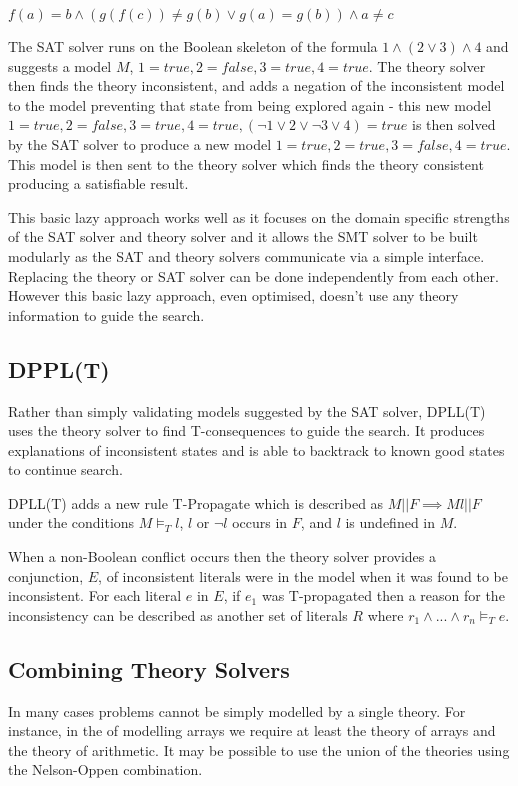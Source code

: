 \documentclass[]{final_report}
\begin{document}
$ f(a) = b \land  (g(f(c)) \neq g(b) \lor g(a) = g(b)) \land a \neq c $

The SAT solver runs on the Boolean skeleton of the formula $1 \land (2 \lor 3) \land 4$ and suggests a model $M$, $1 = \mathit{true}, 2 = \mathit{false}, 3 = \mathit{true}, 4 = \mathit{true}$. The theory solver then finds the theory inconsistent, and adds a negation of the inconsistent model to the model preventing that state from being explored again - this new model $ 1 = \mathit{true}, 2 = \mathit{false}, 3 = \mathit{true}, 4 = \mathit{true}, (\lnot 1 \lor 2 \lor \lnot 3 \lor 4 ) = true $  is then solved by the SAT solver to produce a new model $ 1 = \mathit{true}, 2 = \mathit{true}, 3 = \mathit{false}, 4 = \mathit{true}$. This model is then sent to the theory solver which finds the theory consistent producing a satisfiable result.

This basic lazy approach works well as it focuses on the domain specific strengths of the SAT solver and theory solver and it allows the SMT solver to be built modularly as the SAT and theory solvers communicate via a simple interface. Replacing the theory or SAT solver can be done independently from each other. However this basic lazy approach, even optimised, doesn't use any theory information to guide the search. ~\cite{sattosmt}

\subsection{DPPL(T)}
Rather than simply validating models suggested by the SAT solver, DPLL(T) uses the theory solver to find T-consequences to guide the search. It produces explanations of inconsistent states and is able to backtrack to known good states to continue search. ~\cite{smtdpplt} ~\cite{ganzinger2004dpll}

DPLL(T) adds a new rule T-Propagate which is described as $M || F \implies M l || F $ under the conditions $M \models _T l$, $l$ or $\lnot l$ occurs in $F$, and $l$ is undefined in $M$.  ~\cite{sattosmt}

When a non-Boolean conflict occurs then the theory solver provides a conjunction, $E$, of inconsistent literals were in the model when it was found to be inconsistent.  For each literal $e $ in $E$, if $e_1$ was T-propagated then a reason for the inconsistency can be described as another set of literals $R$ where $r_1 \land ... \land r_n \models _T e$. 

\subsection{Combining Theory Solvers}
In many cases problems cannot be simply modelled by a single theory. For instance, in the of modelling arrays we require at least the theory of arrays and the theory of arithmetic. It may be possible to use the union of the theories using the Nelson-Oppen combination. ~\cite{smtdpplt}
\end{document}
